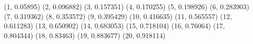 (1, 0.05895) (2, 0.096882) (3, 0.157351) (4, 0.170255) (5, 0.198926) (6, 0.283903) (7, 0.319362) (8, 0.353572) (9, 0.395429) (10, 0.416635) (11, 0.565557) (12, 0.611283) (13, 0.650902) (14, 0.683053) (15, 0.718104) (16, 0.76064) (17, 0.804344) (18, 0.83463) (19, 0.883677) (20, 0.918114) 